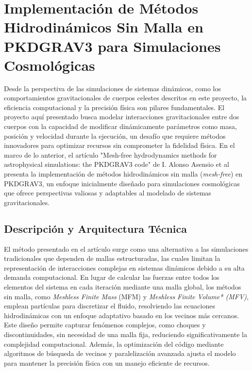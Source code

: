\section[Métodos Hidrodinámicos Sin Malla]{Implementación de Métodos Hidrodinámicos Sin Malla en PKDGRAV3 para Simulaciones Cosmológicas}\label{sec:mesh-free_hydrodynamics}

Desde la perspectiva de las simulaciones de sistemas dinámicos, como los comportamientos gravitacionales de cuerpos celestes descritos en este proyecto, la eficiencia computacional y la precisión física son pilares fundamentales. El proyecto aquí presentado busca modelar interacciones gravitacionales entre dos cuerpos con la capacidad de modificar dinámicamente parámetros como masa, posición y velocidad durante la ejecución, un desafío que requiere métodos innovadores para optimizar recursos sin comprometer la fidelidad física. En el marco de lo anterior, el artículo "Mesh-free hydrodynamics methods for astrophysical simulations: the PKDGRAV3 code" de I. Alonso Asensio et al~\cite{AlonsoAsensio2022} presenta la implementación de métodos hidrodinámicos sin malla (\textit{mesh-free}) en PKDGRAV3, un enfoque inicialmente diseñado para simulaciones cosmológicas que ofrece perspectivas valiosas y adaptables al modelado de sistemas gravitacionales.

\subsection{Descripción y Arquitectura Técnica}

El método presentado en el artículo surge como una alternativa a las simulaciones tradicionales que dependen de mallas estructuradas, las cuales limitan la representación de interacciones complejas en sistemas dinámicos debido a su alta demanda computacional. En lugar de calcular las fuerzas entre todos los elementos del sistema en cada iteración mediante una malla global, los métodos sin malla, como \textit{Meshless Finite Mass} (MFM) y \textit{Meshless Finite Volume* (MFV)}, emplean partículas para discretizar el fluido, resolviendo las ecuaciones hidrodinámicas con un enfoque adaptativo basado en los vecinos más cercanos. Este diseño permite capturar fenómenos complejos, como choques y discontinuidades, sin necesidad de una malla fija, reduciendo significativamente la complejidad computacional. Además, la optimización del código mediante algoritmos de búsqueda de vecinos y paralelización avanzada ajusta el modelo para mantener la precisión física con un manejo eficiente de recursos.

